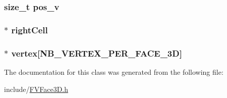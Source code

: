 \label{de/df5/classFVFace3D_a6320f7771a5dd32537e636a23fbf7e7c}
\hypertarget{classFVFace3D_a9edf0688f0159bed5d3a6828f63146fd}{
\subsubsection[{pos\_\-v}]{\setlength{\rightskip}{0pt plus 5cm}size\_\-t {\bf pos\_\-v}}}
\label{de/df5/classFVFace3D_a9edf0688f0159bed5d3a6828f63146fd}
\hypertarget{classFVFace3D_aca0787b6acdd2934da16d4a600f75732}{
\subsubsection[{rightCell}]{ $\ast$ {\bf rightCell}}}
\label{de/df5/classFVFace3D_aca0787b6acdd2934da16d4a600f75732}
\hypertarget{classFVFace3D_ac405432b9a986bb191c3eda7e7163a60}{
\subsubsection[{vertex}]{$\ast$ {\bf vertex}\mbox{[}NB\_\-VERTEX\_\-PER\_\-FACE\_\-3D\mbox{]}}}
\label{de/df5/classFVFace3D_ac405432b9a986bb191c3eda7e7163a60}


The documentation for this class was generated from the following file:\begin{DoxyCompactItemize}
\item 
include/\hyperlink{FVFace3D_8h}{FVFace3D.h}\end{DoxyCompactItemize}
